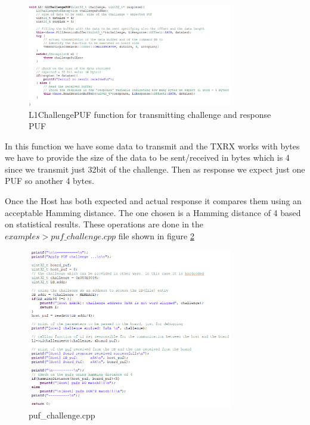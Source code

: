\begin{figure}[h!]
	\vspace{0.5cm}
	\includegraphics[width = 0.8\textwidth]{images/L1ChallengePUF.png}
	\caption{L1ChallengePUF function for transmitting challenge and response PUF}
	\label{fig:L1ChallengePUF}
\end{figure}


In this function we have some data to transmit and the TXRX works with bytes we have to provide the size of the data to be sent/received in bytes which is 4 since we transmit just 32bit of the challenge. Then as response we expect just one PUF so another 4 bytes.

Once the Host has both expected and actual response it compares them using an acceptable Hamming distance. The one chosen is a Hamming distance of 4 based on statistical results. These operations are done in the $examples > puf\_challenge.cpp$ file shown in figure \ref{fig:puf_challenge.cpp}

\begin{figure}[h!]
	\vspace{0.5cm}
	\includegraphics[width = 0.8\textwidth]{images/puf_challenge.png}
	\caption{puf\_challenge.cpp}
	\label{fig:puf_challenge.cpp}
\end{figure}

